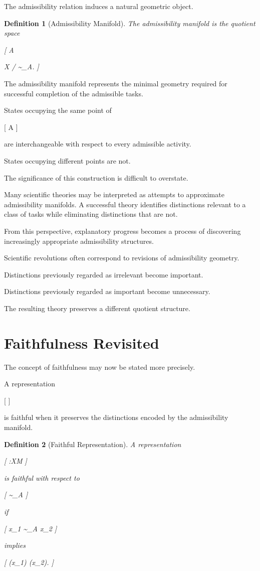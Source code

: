 \documentclass[11pt,oneside,openany]{book}
\newtheorem{definition}{Definition}[chapter] \newtheorem{theorem}{Theorem}[chapter] \newtheorem{proposition}{Proposition}[chapter] \newtheorem{lemma}{Lemma}[chapter] \newtheorem{corollary}{Corollary}[chapter] \newtheorem{remark}{Remark}[chapter]
\begin{document}
The admissibility relation induces a natural geometric object.

\begin{definition}[Admissibility Manifold]

The admissibility manifold is the quotient space

[
\mathcal A

\mathcal X / \sim_A.
]

\end{definition}

The admissibility manifold represents the minimal geometry required for successful completion of the admissible tasks.

States occupying the same point of

[
\mathcal A
]

are interchangeable with respect to every admissible activity.

States occupying different points are not.

The significance of this construction is difficult to overstate.

Many scientific theories may be interpreted as attempts to approximate admissibility manifolds. A successful theory identifies distinctions relevant to a class of tasks while eliminating distinctions that are not.

From this perspective, explanatory progress becomes a process of discovering increasingly appropriate admissibility structures.

Scientific revolutions often correspond to revisions of admissibility geometry.

Distinctions previously regarded as irrelevant become important.

Distinctions previously regarded as important become unnecessary.

The resulting theory preserves a different quotient structure.

\section{Faithfulness Revisited}

The concept of faithfulness may now be stated more precisely.

A representation

[
\pi
]

is faithful when it preserves the distinctions encoded by the admissibility manifold.

\begin{definition}[Faithful Representation]

A representation

[
\pi:\mathcal X\rightarrow\mathcal M
]

is faithful with respect to

[
\sim_A
]

if

[
x_1 \not\sim_A x_2
]

implies

[
\pi(x_1)
\neq
\pi(x_2).
]

\end{definition}
\end{document}
